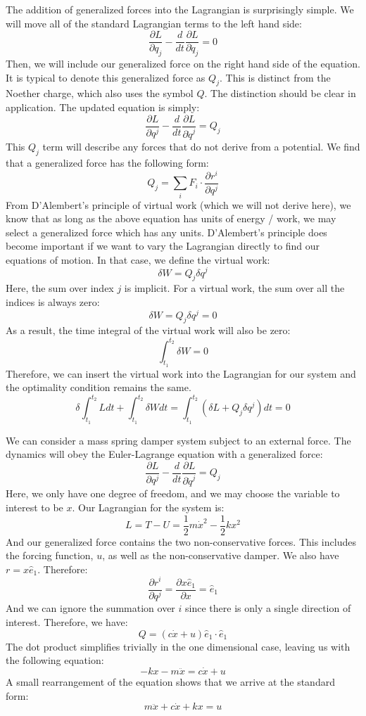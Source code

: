 The addition of generalized forces into the \gls{Lagrangian} is surprisingly simple. We will move all of the standard \gls{Lagrangian} terms to the left hand side:
$$\frac{\partial L}{\partial q_j}-\frac{d}{dt}\frac{\partial L}{\partial \dot{q}_j}=0$$
Then, we will include our generalized force on the right hand side of the equation. It is typical to denote this generalized force as $Q_j$. This is distinct from the Noether charge, which also uses the symbol $Q$. The distinction should be clear in application. The updated equation is simply:
$$\frac{\partial L}{\partial q^j}-\frac{d}{dt}\frac{\partial L}{\partial \dot{q}^j}=Q_j$$
This $Q_j$ term will describe any forces that do not derive from a potential. We find that a generalized force has the following form:
$$Q_j=\sum_i F_i\cdot\frac{\partial r^i}{\partial q^j}$$
From D'Alembert's principle of virtual work (which we will not derive here), we know that as long as the above equation has units of energy / work, we may select a generalized force which has any units. D'Alembert's principle does become important if we want to vary the \gls{Lagrangian} directly to find our equations of motion. In that case, we define the virtual work:
$$\delta W=Q_j\delta q^j$$
Here, the sum over index $j$ is implicit. For a virtual work, the sum over all the indices is always zero:
$$\delta W=Q_j\delta q^j=0$$
As a result, the time integral of the virtual work will also be zero:
$$\int_{t_1}^{t_2}\delta W=0$$
Therefore, we can insert the virtual work into the \gls{Lagrangian} for our system and the optimality condition remains the same.
$$\delta\int_{t_1}^{t_2}Ldt+\int_{t_1}^{t_2}\delta Wdt=\int_{t_1}^{t_2}
(\delta L+Q_j\delta q^j)dt=0$$

\begin{example}
We can consider a mass spring damper system subject to an external force. The dynamics will obey the Euler-Lagrange equation with a generalized force:
$$\frac{\partial L}{\partial q^j}-\frac{d}{dt}\frac{\partial L}{\partial \dot{q}^j}=Q_j$$
Here, we only have one degree of freedom, and we may choose the variable to interest to be $x$. Our \gls{Lagrangian} for the system is:
$$L=T-U=\frac{1}{2}m\dot{x}^2-\frac{1}{2}kx^2$$
And our generalized force contains the two non-conservative forces. This includes the forcing function, $u$, as well as the non-conservative damper. We also have $r=x\hat{e}_1$. Therefore:
$$\frac{\partial r^i}{\partial q^j}=\frac{\partial x \hat{e}_1}{\partial x}=\hat{e}_1$$
And we can ignore the summation over $i$ since there is only a single direction of interest. Therefore, we have:
$$Q=(c\dot{x}+u)\hat{e}_1\cdot\hat{e}_1$$
The dot product simplifies trivially in the one dimensional case, leaving us with the following equation:
$$-kx-m\ddot{x}=c\dot{x}+u$$
A small rearrangement of the equation shows that we arrive at the standard form:
$$m\ddot{x}+c\dot{x}+kx=u$$
\end{example}


